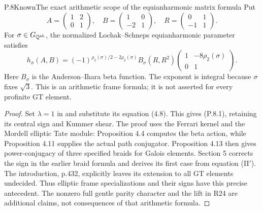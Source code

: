 \begin{statement}{P.8}{Known}{The exact arithmetic scope of the equianharmonic matrix formula}
Put
\[
 A=\begin{pmatrix}1&2\\0&1\end{pmatrix},\quad
 B=\begin{pmatrix}1&0\\-2&1\end{pmatrix},\quad
 R=\begin{pmatrix}0&1\\-1&1\end{pmatrix}.
\]
For $\sigma\in G_{\mathbb Q^{\rm ab}}$, the normalized
Lochak--Schneps equianharmonic parameter satisfies
\[
 h_\sigma(A,B)=(-1)^{\rho_3(\sigma)/2-2\rho_2(\sigma)}
 B_\sigma(R,R^2)
 \begin{pmatrix}1&-8\rho_2(\sigma)\\0&1\end{pmatrix}.
                                                        \tag{P.8.1}
\]
Here $B_\sigma$ is the Anderson--Ihara beta function.
The exponent is integral because $\sigma$ fixes $\sqrt3$.
This is an arithmetic frame formula; it is not asserted
for every profinite GT element.
\end{statement}
\begin{proof}
Set $\lambda=1$ in \cite[Theorem 4.16, p.446]{ROOT_NTY2010}
and substitute its equation (4.8). This gives (P.8.1),
retaining its central sign and Kummer shear.
The proof uses the Ferrari kernel and the Mordell
elliptic Tate module: Proposition 4.4 computes the beta
action, while Proposition 4.11 supplies the actual path
conjugator. Proposition 4.13 then gives power-conjugacy
of three specified braids for Galois elements.
Section 5 corrects the sign in the earlier braid
formula and derives its first case from equation
(II$'$). The introduction, p.432, explicitly leaves
its extension to all GT elements undecided.
Thus elliptic frame specializations and their signs
have this precise antecedent. The nonzero full gentle
parity character and the lift in R24 are additional
claims, not consequences of that arithmetic formula.
\end{proof}
